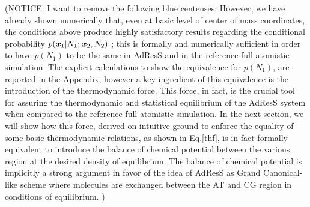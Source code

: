 \documentclass[aip,jcp,a4paper,reprint,onecolumn]{revtex4-1}
\newcommand{\bluec}[1]{{\color{blue} #1}}
\newcommand{\vect}[1]{\textbf{\textit{#1}}}
\begin{document}
\bluec{
  (NOTICE: I want to remove the following blue centenses:
However, we have already shown numerically that, even at basic level of center of mass coordinates, the conditions above produce highly satisfactory results regarding the conditional probability $p(\vect x_1 | N_1; \vect x_2, N_2)$  \cite{rdfcorr}; this is formally and numerically sufficient in order to have $p(N_{1})$ to be the same in AdResS and in the reference full atomistic simulation. The explicit calculations to show the equivalence for $p(N_{1})$, are reported in the Appendix, however a key ingredient of this equivalence is the introduction of the thermodynamic force. This force, in fact, is the crucial tool for assuring the thermodynamic and statistical equilibrium of the AdResS system when compared to the reference full atomistic simulation. In the next section, we will show how this force, derived on intuitive ground to enforce the equality of some basic thermodynamic relations, as shown in Eq.\ref{thf}, is in fact formally equivalent to introduce the balance of chemical potential between the various region at the desired density of equilibrium. The balance of chemical potential is implicitly a strong argument in favor of the idea of AdResS as Grand Canonical-like scheme where molecules are exchanged between the AT and CG region in conditions of equilibrium. 
)}
\end{document}
